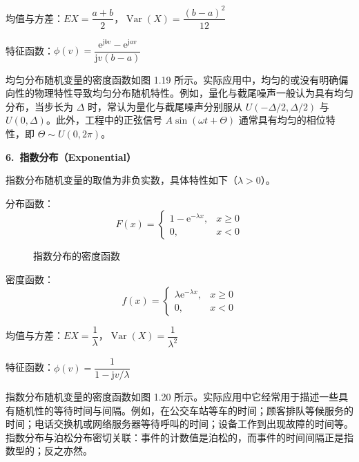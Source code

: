 \documentclass[11pt,openany,UTF8]{ctexbook}
\newcommand{\eu}{\mathrm{e}}                       %
\newcommand{\ju}{\mathrm{j}}                       %
\DeclareMathOperator{\Var}{Var}                    %
\newcommand{\bhead}[1]{\par\medskip\noindent\textbf{#1}\par\smallskip}
\begin{document}
均值与方差\nobreak：\quad $EX=\dfrac{a+b}{2}$\nobreak，\quad $\Var(X)=\dfrac{(b-a)^2}{12}$

特征函数\nobreak：\quad $\phi(v)=\dfrac{\eu^{\ju bv}-\eu^{\ju av}}{\ju v(b-a)}$

均匀分布随机变量的密度函数如图 1.19 所示\nobreak。实际应用中\nobreak，均匀的或没有明确偏向性的物理特性导致均匀分布随机特性\nobreak。例如\nobreak，量化与截尾噪声一般认为具有均匀分布\nobreak，当步长为 $\Delta$ 时\nobreak，常认为量化与截尾噪声分别服从 $U(-\Delta/2,\Delta/2)$ 与 $U(0,\Delta)$\nobreak。此外\nobreak，工程中的正弦信号 $A\sin(\omega t+\Theta)$ 通常具有均匀的相位特性\nobreak，即 $\Theta\sim U(0,2\pi)$\nobreak。

\bhead{6.\ 指数分布（Exponential\nobreak）}
\noindent
指数分布随机变量的取值为非负实数\nobreak，具体特性如下（$\lambda>0$\nobreak）\nobreak。

分布函数\nobreak：
\[
F(x)=\begin{cases}
1-\eu^{-\lambda x}, & x\geqslant 0\\
0, & x<0
\end{cases}
\]

\begin{figure}
  \centering
  \caption{指数分布的密度函数}
  \label{fig:1.20}
\end{figure}

密度函数\nobreak：
\[
f(x)=\begin{cases}
\lambda\eu^{-\lambda x}, & x\geqslant 0\\
0, & x<0
\end{cases}
\]

均值与方差\nobreak：\quad $EX=\dfrac{1}{\lambda}$\nobreak，\quad $\Var(X)=\dfrac{1}{\lambda^2}$

特征函数\nobreak：\quad $\phi(v)=\dfrac{1}{1-\ju v/\lambda}$

指数分布随机变量的密度函数如图 1.20 所示\nobreak。实际应用中它经常用于描述一些具有随机性的等待时间与间隔\nobreak。例如\nobreak，在公交车站等车的时间\nobreak；顾客排队等候服务的时间\nobreak；电话交换机或网络服务器等待呼叫的时间\nobreak；设备工作到出现故障的时间等\nobreak。指数分布与泊松分布密切关联\nobreak：事件的计数值是泊松的\nobreak，而事件的时间间隔正是指数型的\nobreak；反之亦然\nobreak。
\end{document}
